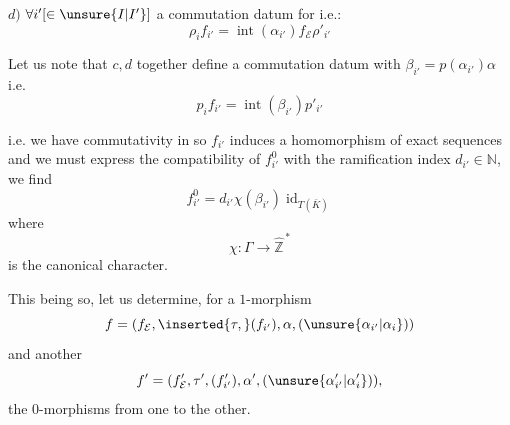 $d)$ $\forall i'[\in\unsure{I|I'}]$ a commutation datum for
i.e.:
\[
\boxed{\rho_i f_{i'}=\operatorname{int}(\alpha_{i'})f_{\mathcal E}\rho'_{i'}}
\]

Let us note that $c,d$ together define a commutation datum
with $\beta_{i'}=p(\alpha_{i'})\alpha$
i.e.
\[
p_i f_{i'}=\operatorname{int}(\beta_{i'})p'_{i'}
\]


i.e. we have commutativity in
so $f_{i'}$ induces a homomorphism of exact sequences
and we must express the compatibility of $f^0_{i'}$ with the ramification index $d_{i'}\in\mathbb N$, we find
\[
\boxed{f^0_{i'}=d_{i'}\chi(\beta_{i'})\operatorname{id}_{T(\bar K)}}
\]
where
\[
\chi:\Gamma\longrightarrow\widehat{\mathbb Z}^{\,*}
\]
is the canonical character.

This being so, let us determine, for a $1$-morphism
\[
f=(f_{\mathcal E},\inserted{\tau,}(f_{i'}),\alpha,(\unsure{\alpha_{i'}|\alpha_i}))
\]
and another
\[
f'=(f'_{\mathcal E},\tau',(f'_{i'}),\alpha',(\unsure{\alpha'_{i'}|\alpha'_i})),
\]
the $0$-morphisms from one to the other.
